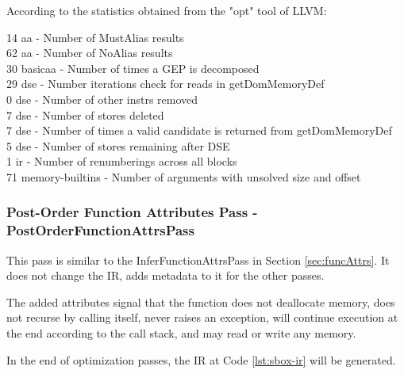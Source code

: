 According to the statistics obtained from the "opt" tool of LLVM:
\begin{displayquote}
14 aa              - Number of MustAlias results \\
62 aa              - Number of NoAlias results \\
30 basicaa         - Number of times a GEP is decomposed \\
29 dse             - Number iterations check for reads in getDomMemoryDef \\
 0 dse             - Number of other instrs removed \\
 7 dse             - Number of stores deleted \\
 7 dse             - Number of times a valid candidate is returned from getDomMemoryDef \\
 5 dse             - Number of stores remaining after DSE \\
 1 ir              - Number of renumberings across all blocks \\
71 memory-builtins - Number of arguments with unsolved size and offset \\
\end{displayquote}

\subsubsection{Post-Order Function Attributes Pass - PostOrderFunctionAttrsPass}
This pass is similar to the InferFunctionAttrsPass in Section \ref{sec:funcAttrs}. It does not change the IR, adds metadata to it for the other passes.

\begin{minipage}{\linewidth}

\end{minipage}



The added attributes signal that the function does not deallocate memory, does not recurse by calling itself, never raises an exception, will continue execution at the end according to the call stack, and may read or write any memory. 

In the end of optimization passes, the IR at Code \ref{lst:sbox-ir} will be generated.

